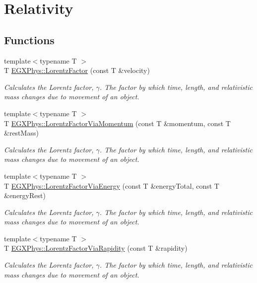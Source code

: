 \hypertarget{group___relativity}{}\section{Relativity}
\label{group___relativity}
\subsection*{Functions}
\begin{DoxyCompactItemize}
\item 
{\footnotesize template$<$typename T $>$ }\\T \hyperlink{group___relativity_ga5f9b11c1f4c3ae26a7e64f02c22d5a75}{E\+G\+X\+Phys\+::\+Lorentz\+Factor} (const T \&velocity)
\begin{DoxyCompactList}\small\item\em Calculates the Lorentz factor, $\gamma$. The factor by which time, length, and relativistic mass changes due to movement of an object. \end{DoxyCompactList}\item 
{\footnotesize template$<$typename T $>$ }\\T \hyperlink{group___relativity_ga1ea24128654ac333dd843afdd5c003b7}{E\+G\+X\+Phys\+::\+Lorentz\+Factor\+Via\+Momentum} (const T \&momentum, const T \&rest\+Mass)
\begin{DoxyCompactList}\small\item\em Calculates the Lorentz factor, $\gamma$. The factor by which time, length, and relativistic mass changes due to movement of an object. \end{DoxyCompactList}\item 
{\footnotesize template$<$typename T $>$ }\\T \hyperlink{group___relativity_ga601de8c039be89a9abea22bc459436c9}{E\+G\+X\+Phys\+::\+Lorentz\+Factor\+Via\+Energy} (const T \&energy\+Total, const T \&energy\+Rest)
\begin{DoxyCompactList}\small\item\em Calculates the Lorentz factor, $\gamma$. The factor by which time, length, and relativistic mass changes due to movement of an object. \end{DoxyCompactList}\item 
{\footnotesize template$<$typename T $>$ }\\T \hyperlink{group___relativity_ga8064f5bce1d2ca5f7bc39d95ba4d2dd9}{E\+G\+X\+Phys\+::\+Lorentz\+Factor\+Via\+Rapidity} (const T \&rapidity)
\begin{DoxyCompactList}\small\item\em Calculates the Lorentz factor, $\gamma$. The factor by which time, length, and relativistic mass changes due to movement of an object. \end{DoxyCompactList}\end{DoxyCompactItemize}


